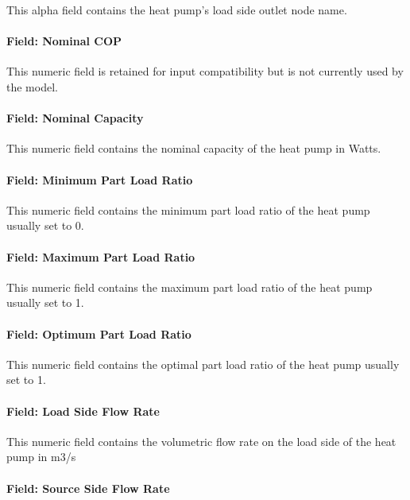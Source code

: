 This alpha field contains the heat pump's load side outlet node name.

\paragraph{Field: Nominal COP}\label{field-nominal-cop-4}

This numeric field is retained for input compatibility but is not currently used by the model.

\paragraph{Field: Nominal Capacity}\label{field-nominal-capacity-8}

This numeric field contains the nominal capacity of the heat pump in Watts.

\paragraph{Field: Minimum Part Load Ratio}\label{field-minimum-part-load-ratio-11}

This numeric field contains the minimum part load ratio of the heat pump usually set to 0.

\paragraph{Field: Maximum Part Load Ratio}\label{field-maximum-part-load-ratio-11}

This numeric field contains the maximum part load ratio of the heat pump usually set to 1.

\paragraph{Field: Optimum Part Load Ratio}\label{field-optimum-part-load-ratio-11}

This numeric field contains the optimal part load ratio of the heat pump usually set to 1.

\paragraph{Field: Load Side Flow Rate}\label{field-load-side-flow-rate}

This numeric field contains the volumetric flow rate on the load side of the heat pump in m3/s

\paragraph{Field: Source Side Flow Rate}\label{field-source-side-flow-rate}

